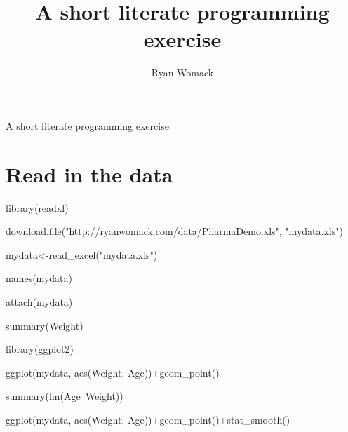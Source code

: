 \documentclass{article}
\begin{document}
\title{\textbf{A short literate programming exercise}}
\author{Ryan Womack}
\maketitle
{}

A short literate programming exercise

\section{Read in the data}

library(readxl)

download.file("http://ryanwomack.com/data/PharmaDemo.xls", "mydata.xls")

mydata<-read_excel("mydata.xls")

names(mydata)

attach(mydata)

summary(Weight)

library(ggplot2)

ggplot(mydata, aes(Weight, Age))+geom_point()

summary(lm(Age~Weight))

ggplot(mydata, aes(Weight, Age))+geom_point()+stat_smooth()
\end{document}
